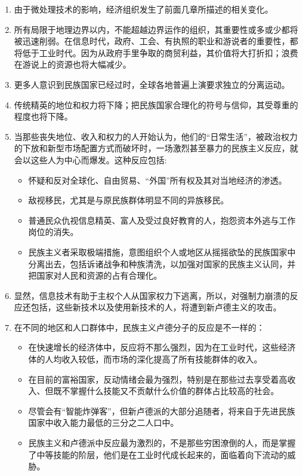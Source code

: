 \begin{enumerate}
    \item 由于微处理技术的影响，经济组织发生了前面几章所描述的相关变化。
    \item 所有局限于地理边界以内，不能超越边界运作的组织，其重要性或多或少都将被迅速削弱。在信息时代，政府、工会、有执照的职业和游说者的重要性，都将低于工业时代。因为从政府手里争取的商贸利益，其价值将大打折扣；浪费在游说上的资源也将大幅减少。
    \item 更多人意识到民族国家已经过时，全球各地普遍上演要求独立的分离运动。
    \item 传统精英的地位和权力将下降；把民族国家合理化的符号与信仰，其受尊重的程度也将下降。
    \item 当那些丧失地位、收入和权力的人开始认为，他们的“日常生活”，被政治权力的下放和新型市场配置方式而破坏时，一场激烈甚至暴力的民族主义反应，就会以这些人为中心而爆发。这种反应包括:
    \begin{itemize}
        \item 怀疑和反对全球化、自由贸易、“外国”所有权及其对当地经济的渗透。
        \item 敌视移民，尤其是与原民族群体明显不同的异族移民。
        \item 普通民众仇视信息精英、富人及受过良好教育的人，抱怨资本外逃与工作岗位的消失。
        \item 民族主义者采取极端措施，意图组织个人或地区从摇摇欲坠的民族国家中分离出去，包括诉诸战争和种族清洗，以加强对国家的民族主义认同，并把国家对人民和资源的占有合理化。
    \end{itemize}
    \item 显然，信息技术有助于主权个人从国家权力下逃离，所以，对强制力崩溃的反应还包括，这些新技术以及使用新技术的人，将遭到新卢德主义的攻击。
    \item 在不同的地区和人口群体中，民族主义卢德分子的反应是不一样的：
    \begin{itemize}
        \item 在快速增长的经济体中，反应将不那么强烈，因为在工业时代，这些经济体的人均收入较低，而市场的深化提高了所有技能群体的收入。
        \item 在目前的富裕国家，反动情绪会最为强烈，特别是在那些过去享受着高收入、但既不掌握什么技能又不贡献什么价值的群体占比较高的社会。
        \item 尽管会有“智能炸弹客”，但新卢德派的大部分追随者，将来自于先进民族国家中收入能力最低的三分之二人口中。
        \item 民族主义和卢德派中反应最为激烈的，不是那些穷困潦倒的人，而是掌握了中等技能的阶层，他们是在工业时代成长起来的，面临着向下流动的威胁。

\end{itemize}
\end{enumerate}
